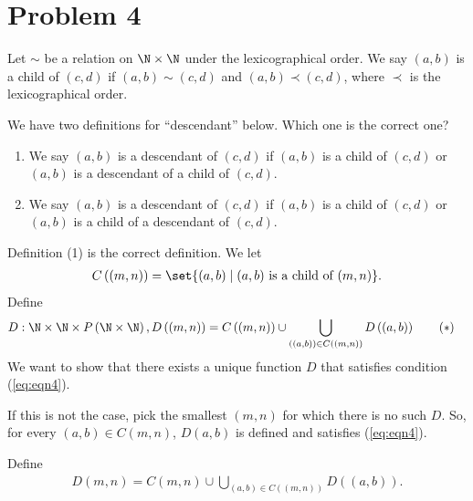 \documentclass[10pt]{mypackage}
\begin{document}
\RaggedRight
\section{Problem 4}%
\begin{problem}
  Let $\sim$ be a relation on $\N\times \N$ under the lexicographical order. We say $(a,b)$ is a child of $(c,d)$ if $(a,b)\sim (c,d)$ and $(a,b) \prec (c,d)$, where $\prec$ is the lexicographical order.\newline

  We have two definitions for ``descendant'' below. Which one is the correct one?
  \begin{enumerate}[(1)]
    \item We say $(a,b)$ is a descendant of $(c,d)$ if $(a,b)$ is a child of $(c,d)$ or $(a,b)$ is a descendant of a child of $(c,d)$.
    \item We say $(a,b)$ is a descendant of $(c,d)$ if $(a,b)$ is a child of $(c,d)$ or $(a,b)$ is a child of a descendant of $(c,d)$.
  \end{enumerate}
\end{problem}
\begin{solution}
  Definition (1) is the correct definition. We let
  \begin{align*}
    C\left((m,n)\right) = \set{(a,b)\mid (a,b)\text{ is a child of }(m,n)}.
  \end{align*}
  Define
  \begin{align*}
    D: \N\times \N\times P\left(\N\times \N\right),
    D\left(\left(m,n\right)\right) &= C\left((m,n)\right) \cup \bigcup_{\left((a,b)\right)\in C\left(\left(m,n\right)\right)} D\left(\left(a,b\right)\right)\label{eq:eqn4}\tag{\textasteriskcentered}
  \end{align*}
  We want to show that there exists a unique function $D$ that satisfies condition (\ref{eq:eqn4}).\newline

  If this is not the case, pick the smallest $(m,n)$ for which there is no such $D$. So, for every $(a,b)\in C(m,n)$, $D(a,b)$ is defined and satisfies (\ref{eq:eqn4}).\newline

  Define 
  \begin{align*}
    D(m,n) = C\left(m,n\right)\cup \bigcup_{\left(a,b\right)\in C\left(\left(m,n\right)\right)} D\left((a,b)\right).
  \end{align*}
\end{solution}
\end{document}

